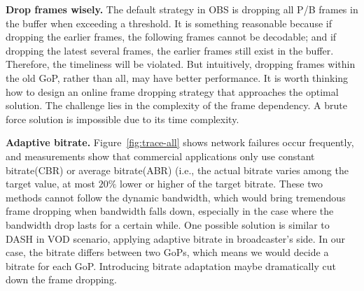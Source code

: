 
\textbf{Drop frames wisely.} The default strategy in OBS is dropping all P/B frames in the buffer when exceeding a threshold. It is something reasonable because if dropping the earlier frames, the following frames cannot be decodable; and if dropping the latest several frames, the earlier frames still exist in the buffer. Therefore, the timeliness will be violated. But intuitively, dropping frames within the old GoP, rather than all, may have better performance. It is worth thinking how to design an online frame dropping strategy that approaches the optimal solution. The challenge lies in the complexity of the frame dependency. A brute force solution is impossible due to its time complexity.

\textbf{Adaptive bitrate.} Figure~\ref{fig:trace-all} shows network failures occur frequently, and measurements show that commercial applications only use constant bitrate(CBR) or average bitrate(ABR) (i.e., the actual bitrate varies among the target value, at most $20\%$ lower or higher of the target bitrate. These two methods cannot follow the dynamic bandwidth, which would bring tremendous frame dropping when bandwidth falls down, especially in the case where the bandwidth drop lasts for a certain while. One possible solution is similar to DASH in VOD scenario, applying adaptive bitrate in broadcaster's side. In our case, the bitrate differs between two GoPs, which means we would decide a bitrate for each GoP. Introducing bitrate adaptation maybe dramatically cut down the frame dropping.

\iffalse
\begin{itemize}
\item If we can relax the dependency between frames, the solution space would be larger and more optimal solutions are expected to be found. That is, we can relax the decodability constraints to be $d_i = 1, \forall i$.

\item We can relax queue length constraint, i.e., making $T_1$ larger. This change similarly increases the space of possible solutions.

\item The frame drop strategy can be improved. That is, compared with the naive strategy in OBS (dropping all P/B when exceeding a threshold), selectively choosing frames to drop in IP would give a more optimal solution.
\end{itemize}
\fi

